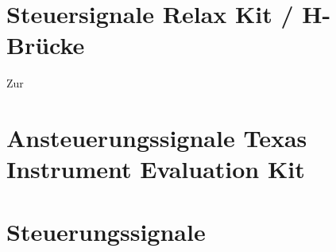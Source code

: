 \section{Steuersignale Relax Kit / H-Brücke}
Zur 



\section{Ansteuerungssignale Texas Instrument Evaluation Kit}

\section{Steuerungssignale }
